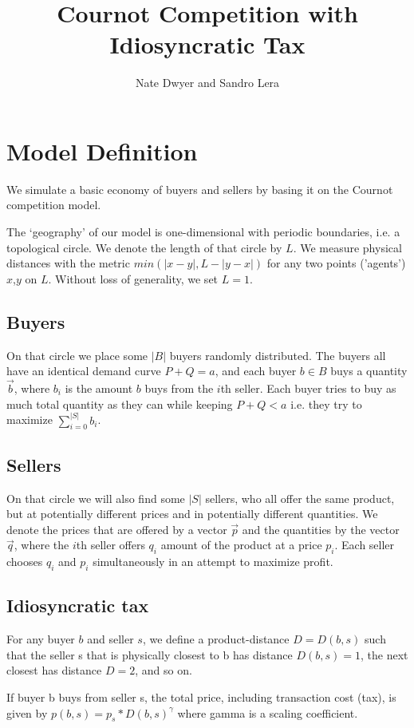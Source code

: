 \documentclass[14pt]{article}
\title{Cournot Competition with Idiosyncratic Tax}
\author{Nate Dwyer and Sandro Lera}
\begin{document}
\maketitle
\setcounter{section}{0}
\section{Model Definition}
We simulate a basic economy of buyers and sellers by basing it on the Cournot
competition model. 

The `geography' of our model is one-dimensional with periodic boundaries, i.e. a
topological circle. We denote the length of that circle by $L$. We measure
physical distances with the metric $min(|x-y|, L-|y-x|)$ for any two points
('agents') $x$,$y$ on $L$. Without loss of generality, we set $L=1$. 

\subsection{Buyers}
On that circle we place some $|B|$ buyers randomly distributed. The buyers all
have an identical demand curve $P + Q = a$, and each buyer $b\in B$ buys a quantity
$\vec{b}$, where $b_i$ is the amount $b$ buys from the $i$th seller. Each buyer
tries to buy as much total quantity as they can while keeping $P + Q < a$ i.e.
they try to maximize $\sum_{i=0}^{|S|}b_i$. 

\subsection{Sellers}
On that circle we will also find some $|S|$ sellers, who all offer the same
product, but at potentially different prices and in potentially different
quantities. We denote the prices that are offered by a vector $\vec{p}$ and the
quantities by the vector $\vec{q}$, where the $i$th seller offers $q_i$ amount
of the product at a price $p_i$. Each seller chooses $q_i$ and $p_i$
simultaneously in an attempt to maximize profit.  

\subsection{Idiosyncratic tax}
For any buyer $b$ and seller $s$, we define a product-distance $D = D(b,s)$ such
that the seller s that is physically closest to b has distance $D(b,s)=1$, the
next closest has distance $D=2$, and so on. 

If buyer b buys from seller s, the total price, including transaction cost
(tax), is given by $p(b,s) = p_s *  D(b,s)^\gamma$ where gamma is a scaling
coefficient. 
\end{document}
